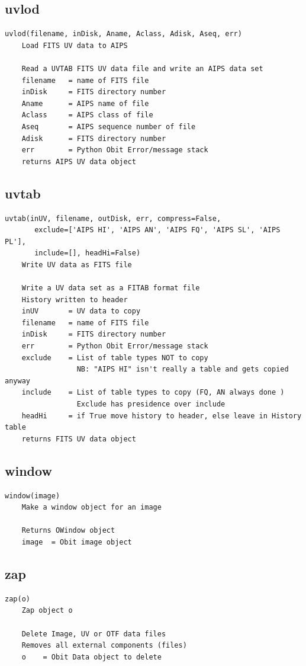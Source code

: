 \documentclass[11pt]{report}
\begin{document}
\subsection{uvlod}
\begin{verbatim}
uvlod(filename, inDisk, Aname, Aclass, Adisk, Aseq, err)
    Load FITS UV data to AIPS
    
    Read a UVTAB FITS UV data file and write an AIPS data set
    filename   = name of FITS file
    inDisk     = FITS directory number
    Aname      = AIPS name of file
    Aclass     = AIPS class of file
    Aseq       = AIPS sequence number of file
    Adisk      = FITS directory number
    err        = Python Obit Error/message stack
    returns AIPS UV data object
\end{verbatim}

\subsection{uvtab}
\begin{verbatim}
uvtab(inUV, filename, outDisk, err, compress=False, 
       exclude=['AIPS HI', 'AIPS AN', 'AIPS FQ', 'AIPS SL', 'AIPS PL'], 
       include=[], headHi=False)
    Write UV data as FITS file
    
    Write a UV data set as a FITAB format file
    History written to header
    inUV       = UV data to copy
    filename   = name of FITS file
    inDisk     = FITS directory number
    err        = Python Obit Error/message stack
    exclude    = List of table types NOT to copy
                 NB: "AIPS HI" isn't really a table and gets copied anyway
    include    = List of table types to copy (FQ, AN always done )
                 Exclude has presidence over include
    headHi     = if True move history to header, else leave in History table
    returns FITS UV data object
\end{verbatim}

\subsection{window}
\begin{verbatim}
window(image)
    Make a window object for an image
    
    Returns OWindow object
    image  = Obit image object
\end{verbatim}

\subsection{zap}
\begin{verbatim}
zap(o)
    Zap object o
    
    Delete Image, UV or OTF data files
    Removes all external components (files)
    o    = Obit Data object to delete
\end{verbatim}
\end{document}
